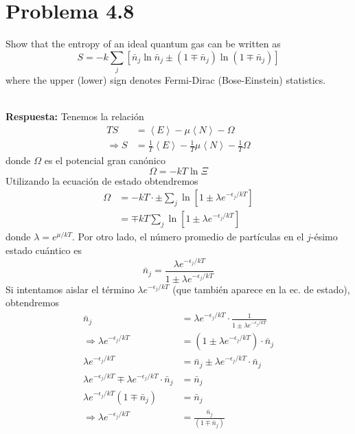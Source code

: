 \documentclass[]{article}
\numberwithin{equation}{section}
\newcommand{\0}{\textcolor{gray}{0}}
\newcommand{\pr}[1]{\left\langle #1 \right\rangle }
\newcommand{\resp}{
	\\
	
	\textbf{Respuesta:} }
\begin{document}
\section{Problema 4.8}
Show that the entropy of an ideal quantum gas can be written as
\begin{equation}
	S = - k \sum_{j} \left[\bar{n}_j \ln \bar{n}_j \pm \left(1 \mp \bar{n}_j\right)\ln\left(1 \mp \bar{n}_j\right)\right]
\end{equation}
where the upper (lower) sign denotes Fermi-Dirac (Bose-Einstein) statistics.
\resp 
Tenemos la relación
\begin{align}
	TS &= \pr{E} - \mu\pr{N} - \Omega \nonumber\\
	\Rightarrow S &= \frac{1}{T}\pr{E} - \frac{1}{T}\mu\pr{N} - \frac{1}{T}\Omega
\end{align}
donde $\Omega$ es el potencial gran canónico
\begin{equation*}
	\Omega = - k T \ln \Xi
\end{equation*}
Utilizando la ecuación de estado obtendremos
\begin{align*}
	\Omega &= - k T \cdot \pm \sum_{j}\ln \left[1 \pm \lambda e^{-\epsilon_j/kT}\right]\\
	&= \mp k T \sum_{j}\ln \left[1 \pm \lambda e^{-\epsilon_j/kT}\right]
\end{align*}
donde $\lambda = e^{\mu/kT}$. Por otro lado, el número promedio de partículas en el $j$-ésimo estado cuántico es
\begin{equation}
	\bar{n}_j = \frac{\lambda e^{-\epsilon_j/kT}}{1 \pm \lambda e^{-\epsilon_j/kT}}
\end{equation}
Si intentamos aislar el término $\lambda e^{-\epsilon_j/kT}$ (que también aparece en la ec. de estado), obtendremos
\begin{align*}
	\bar{n}_j &= \lambda e^{-\epsilon_j/kT} \cdot \frac{1}{1 \pm \lambda e^{-\epsilon_j/kT}}\\
	\Rightarrow \lambda e^{-\epsilon_j/kT} &= \left(1 \pm \lambda e^{-\epsilon_j/kT}\right) \cdot \bar{n}_j\\
	\lambda e^{-\epsilon_j/kT} &= \bar{n}_j \pm \lambda e^{-\epsilon_j/kT} \cdot \bar{n}_j \\
	\lambda e^{-\epsilon_j/kT} \mp \lambda e^{-\epsilon_j/kT} \cdot \bar{n}_j &= \bar{n}_j \\
	\lambda e^{-\epsilon_j/kT} \left( 1 \mp \bar{n}_j\right) &= \bar{n}_j \\
	\Rightarrow \lambda e^{-\epsilon_j/kT} &= \frac{\bar{n}_j}{\left( 1 \mp \bar{n}_j\right)}
\end{align*}
\end{document}
